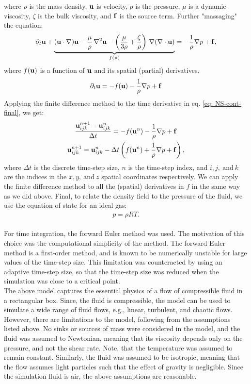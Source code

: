 where $\rho$ is the mass density, $\mathbf{u}$ is velocity, $p$ is the pressure, $\mu$ is a dynamic viscosity, $\zeta$ is the bulk viscosity, and $\mathbf{f}$ is the source term.
Further "massaging" the equation:
\begin{gather}
    \partial_t \mathbf{u} + \underbrace{(\mathbf {u} \cdot \nabla) \mathbf{u} -\frac{\mu}{\rho} \,\nabla ^{2}\mathbf{u}-\left(\frac{\mu}{3\rho} +\frac{\zeta}{\rho} \right)\,\nabla (\nabla \cdot \mathbf{u})}_{f\left(\mathbf{u}\right)} =-{\frac {1}{\rho }}\nabla p + \mathbf{f} ,
\end{gather}
where $f(\mathbf{u})$ is a function of $\mathbf{u}$ and its spatial (partial) derivatives.
\begin{gather}
    \partial_t \mathbf{u}  = -f(\mathbf{u}) -{\frac {1}{\rho }}\nabla p +\mathbf{f} \label{eq: NS-cont-final}
\end{gather}
Applying the finite difference method %
to the time derivative in eq. \ref{eq: NS-cont-final}, we get:
\begin{gather}
    \frac{\mathbf{u}_{ijk}^{n+1} - \mathbf{u}_{ijk}^n}{\Delta t} = -f(\mathbf{u}^n) -{\frac {1}{\rho }}\nabla p+\mathbf{f} \\
    \mathbf{u}_{ijk}^{n+1} = \mathbf{u}_{ijk}^n - \Delta t \left(f(\mathbf{u}^n) + {\frac {1}{\rho }}\nabla p + \mathbf{f}\right), \label{eq: NS-fd}
\end{gather}
where $\Delta t$ is the discrete time-step size, $n$ is the time-step index, and $i,j,~\text{and}~k$ are the indices in the $x,y,~\text{and}~z$ spatial coordinates respectively. We can apply the finite difference method to all the (spatial) derivatives in $f$ in the same way as we did above. Final, to relate the density field to the pressure of the fluid, we use the equation of state for an ideal gas: %
\begin{gather}
    p = \rho R T.
\end{gather}
\\

For time integration, the forward Euler method %
was used. The motivation of this choice was the computational simplicity of the method. The forward Euler method is a first-order method, and is known to be numerically unstable %
for large values of the time-step size. This limitation was counteracted by using an adaptive time-step size, so that the time-step size was reduced when the simulation was close to a critical point. \\

The above model captures the essential physics of a flow of compressible fluid in a rectangular box. Since, the fluid is compressible, the model can be used to simulate a wide range of fluid flows, e.g., linear, turbulent, and chaotic flows.
However, there are limitations to the model, following from the assumptions listed above. No sinks or sources of mass were considered in the model, and the fluid was assumed to Newtonian, meaning that its viscosity depends only on the pressure, and not the shear rate. Note, that the temperature was assumed to remain constant. Similarly, the fluid was assumed to be isotropic, meaning that the flow assumes light particles such that the effect of gravity is negligible. Since the simulation fluid is air, the above assumptions are reasonable. 